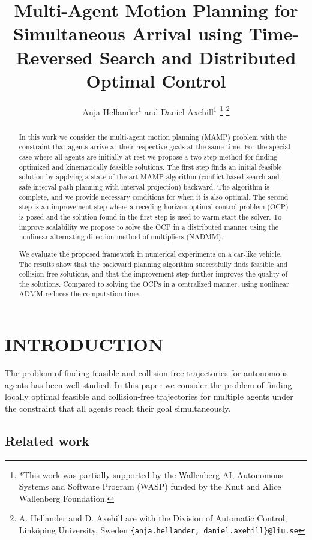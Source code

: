 \documentclass[letterpaper, 10 pt, conference]{ieeeconf}  %
\title{\LARGE \bf
Multi-Agent Motion Planning for Simultaneous Arrival using Time-Reversed Search and Distributed Optimal Control
}
\author{Anja Hellander$^{1}$ and Daniel Axehill$^{1}$%
\thanks{*This work was partially supported by the Wallenberg AI, Autonomous Systems and Software Program (WASP) funded by the Knut and Alice Wallenberg Foundation.}%
\thanks{A. Hellander and D. Axehill are with the Division of Automatic Control,
        Linköping University, Sweden
        {\tt\small \{anja.hellander, daniel.axehill\}@liu.se}}%
}
\begin{document}
\maketitle
\thispagestyle{empty}
\pagestyle{empty}


\begin{abstract}

In this work we consider the multi-agent motion planning (MAMP) problem with the constraint that agents arrive at their respective goals at the same time. For the special case where all agents are initially at rest we propose a two-step method for finding optimized and kinematically feasible solutions. The first step finds an initial feasible solution by applying a state-of-the-art MAMP algorithm (conflict-based search and safe interval path planning with interval projection) backward. The algorithm is complete, and we provide necessary conditions for when it is also optimal. The second step is an improvement step where a receding-horizon optimal control problem (OCP) is posed and the solution found in the first step is used to warm-start the solver. To improve scalability we propose to solve the OCP in a distributed manner using the nonlinear alternating direction method of multipliers (NADMM).

We evaluate the proposed framework in numerical experiments on a car-like vehicle. The results show that the backward planning algorithm successfully finds feasible and collision-free solutions, and that the improvement step further improves the quality of the solutions. Compared to solving the OCPs in a centralized manner, using nonlinear ADMM reduces the computation time.

\end{abstract}


\section{INTRODUCTION}

The problem of finding feasible and collision-free trajectories for autonomous agents has been well-studied. In this paper we consider the problem of finding locally optimal feasible and collision-free trajectories for multiple agents under the constraint that all agents reach their goal simultaneously.  

\subsection{Related work}
\end{document}
